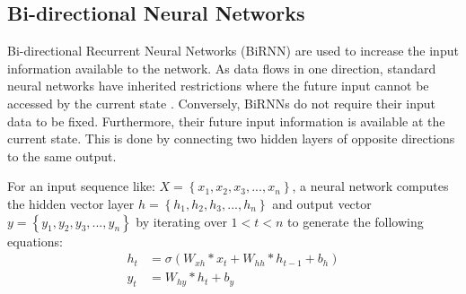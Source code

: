 \subsection{Bi-directional Neural Networks}\label{sub:BiRNN}
Bi-directional Recurrent Neural Networks (BiRNN) are used to increase the input information available to the network. As data flows in one direction, standard neural networks have inherited restrictions where the future input cannot be accessed by the current state \cite{graves2005bidirectional}. Conversely,
BiRNNs do not require their input data to be fixed. Furthermore, their future input information is available at the current state. This is done
by connecting two hidden layers of opposite directions to the same output.

For an input sequence like: $X=\left\{x_1,x_2,x_3,...,x_n \right\}$, a 
neural network computes the hidden vector layer 
$h=\left\{h_1,h_2,h_3,...,h_n \right\}$ and output vector 
$y=\left\{y_1,y_2,y_3,...,y_n \right\}$ by iterating over  $1<t<n$ to generate the following equations:
\begin{align}
h_t &= \sigma(W_{xh}*x_t + W_{hh}*h_{t-1} + b_h)\\
y_t &= W_{hy}*h_t + b_y
\end{align}

